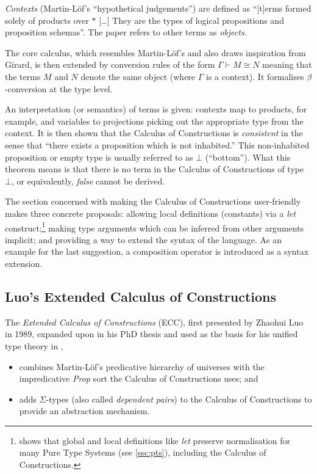 \documentclass[12pt,toc=bibliography,numbers=noendperiod,
               footnotes=multiple,twoside]{scrartcl}
\begin{document}
\emph{Contexts} (Martin-Löf's \enquote{hypothetical judgements}) are defined as \enquote{[t]erms formed solely of products over \(*\) [\dots] They are the types of logical propositions and proposition schemas}. The paper refers to other terms as \emph{objects}.

The core calculus, which resembles Martin-Löf's and also draws inspiration from Girard, is then extended by conversion rules of the form \(\Gamma \vdash M \cong N\) meaning that the terms \(M\) and \(N\) denote the same object (where \(\Gamma\) is a context). It formalises \(\beta\)-conversion at the type level.

An interpretation (or semantics) of terms is given: contexts map to products, for example, and variables to projections picking out the appropriate type from the context. It is then shown that the Calculus of Constructions is \emph{consistent} in the sense that \enquote{there exists a proposition which is not inhabited.} This non-inhabited proposition or empty type is usually referred to as \(\bot\) (\enquote{bottom}). What this theorem means is that there is no term in the Calculus of Constructions of type \(\bot\), or equivalently, \emph{false} cannot be derived.

The section concerned with making the Calculus of Constructions user-friendly makes three concrete proposals: allowing local definitions (constants) via a \textit{let} construct;\footnote{\textcite{severi_pure_1994} shows that global and local definitions like \emph{let} preserve normalisation for many Pure Type Systems (see \cref{ssc:pts}), including the Calculus of Constructions.} making type arguments which can be inferred from other arguments implicit; and providing a way to extend the syntax of the language. As an example for the last suggestion, a composition operator is introduced as a syntax extension.


\subsection{Luo's Extended Calculus of Constructions}

The \emph{Extended Calculus of Constructions} (ECC), first presented by Zhaohui Luo in 1989\autocite{luo_ecc_1989}, expanded upon in his PhD thesis\autocite{luo_extended_1990} and used as the basis for his unified type theory in \autocite{luo_computation_1994},

\begin{itemize}
\item combines Martin-Löf's predicative hierarchy of universes with the impredicative \textit{Prop} sort the Calculus of Constructions uses; and
\item adds \(\Sigma\)-types (also called \emph{dependent pairs}) to the Calculus of Constructions to provide an abstraction mechanism.
\end{itemize}
\end{document}
